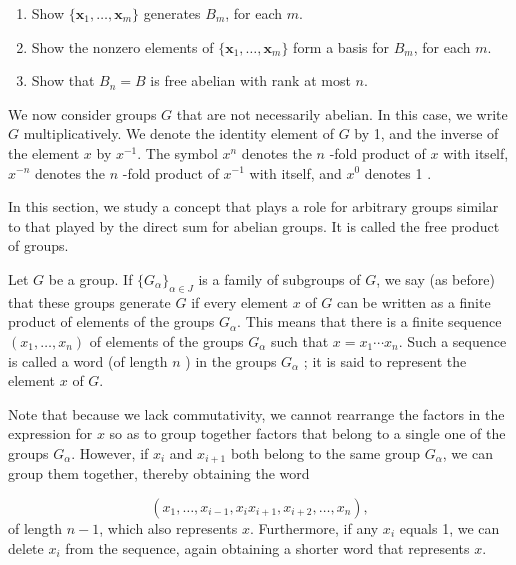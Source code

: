 \begin{enumerate}[itemsep=0.4em, parsep=0pt, topsep=0pt, partopsep=0pt, leftmargin=*, label=\arabic*., ref=\arabic*]
 \begin{enumerate}[itemsep=0.2em, parsep=0pt, topsep=0pt, partopsep=0pt, leftmargin=*, label=(\alph*), align=left]
 \item Show \(\{ {\mathbf{x}_{1},\ldots ,\mathbf{x}_{m}}\}\) generates \(B_{m}\), for each \(m\).
 \item Show the nonzero elements of \(\{ {\mathbf{x}_{1},\ldots ,\mathbf{x}_{m}}\}\) form a basis for \(B_{m}\), for each \(m\).
 \item Show that \(B_{n} = B\) is free abelian with rank at most \(n\). 
 \end{enumerate}
\end{enumerate}

We now consider groups \(G\) that are not necessarily abelian. In this case, we write \(G\) multiplicatively. We denote the identity element of \(G\) by 1, and the inverse of the element \(x\) by \(x^{-1}\). The symbol \(x^{n}\) denotes the \(n\) -fold product of \(x\) with itself, \(x^{-n}\) denotes the \(n\) -fold product of \(x^{-1}\) with itself, and \(x^{0}\) denotes 1 .

In this section, we study a concept that plays a role for arbitrary groups similar to that played by the direct sum for abelian groups. It is called the free product of groups.

Let \(G\) be a group. If \({\{ G_{\alpha }\} }_{\alpha \in J}\) is a family of subgroups of \(G\), we say (as before) that these groups generate \(G\) if every element \(x\) of \(G\) can be written as a finite product of elements of the groups \(G_{\alpha }\). This means that there is a finite sequence \(( {x_{1},\ldots ,x_{n}})\) of elements of the groups \(G_{\alpha }\) such that \(x = x_{1}\cdots {x}_{n}\). Such a sequence is called a word (of length \(n\) ) in the groups \(G_{\alpha }\) ; it is said to represent the element \(x\) of \(G\).

Note that because we lack commutativity, we cannot rearrange the factors in the expression for \(x\) so as to group together factors that belong to a single one of the groups \(G_{\alpha }\). However, if \(x_{i}\) and \(x_{i + 1}\) both belong to the same group \(G_{\alpha }\), we can group them together, thereby obtaining the word

\[
( {x_{1},\ldots ,x_{i - 1},x_{i}x_{i + 1},x_{i + 2},\ldots ,x_{n}}),
\]
of length \(n - 1\), which also represents \(x\). Furthermore, if any \(x_{i}\) equals 1, we can delete \(x_{i}\) from the sequence, again obtaining a shorter word that represents \(x\).

